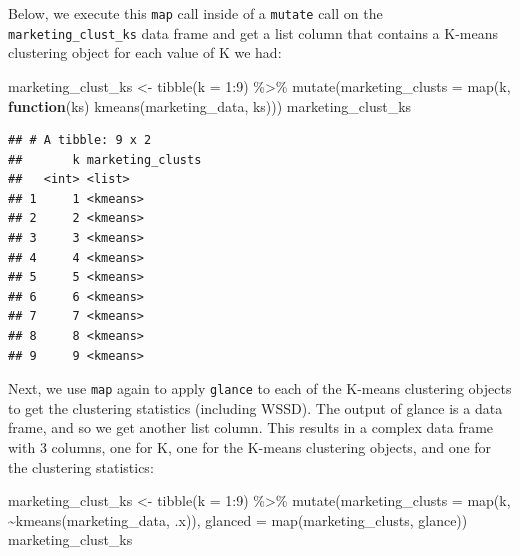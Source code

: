 \documentclass[
]{krantz}
\makeatletter
\newenvironment{Shaded}{\begin{snugshade}}{\end{snugshade}}
\newcommand{\AttributeTok}[1]{\textcolor[rgb]{0.61,0.61,0.61}{#1}}
\newcommand{\ControlFlowTok}[1]{\textcolor[rgb]{0.27,0.27,0.27}{\textbf{#1}}}
\newcommand{\DecValTok}[1]{\textcolor[rgb]{0.06,0.06,0.06}{#1}}
\newcommand{\FunctionTok}[1]{\textcolor[rgb]{0,0,0}{#1}}
\newcommand{\NormalTok}[1]{#1}
\newcommand{\OtherTok}[1]{\textcolor[rgb]{0.37,0.37,0.37}{#1}}
\newcommand{\SpecialCharTok}[1]{\textcolor[rgb]{0,0,0}{#1}}
\newenvironment{kframe}{%
\medskip{}
\setlength{\fboxsep}{.8em}
 \def\at@end@of@kframe{}%
 \ifinner\ifhmode%
  \def\at@end@of@kframe{\end{minipage}}%
  \begin{minipage}{\columnwidth}%
 \fi\fi%
 \def\FrameCommand##1{\hskip\@totalleftmargin \hskip-\fboxsep
 \colorbox{shadecolor}{##1}\hskip-\fboxsep
     \hskip-\linewidth \hskip-\@totalleftmargin \hskip\columnwidth}%
 \MakeFramed {\advance\hsize-\width
   \@totalleftmargin\z@ \linewidth\hsize
   \@setminipage}}%
 {\par\unskip\endMakeFramed%
 \at@end@of@kframe}
\renewenvironment{Shaded}{\begin{kframe}}{\end{kframe}}
\makeatother
\begin{document}
Below, we execute this \texttt{map} call inside of a \texttt{mutate} call on the
\texttt{marketing\_clust\_ks} data frame and get a list column that contains a K-means
clustering object for each value of K we had:

\begin{Shaded}
\begin{Highlighting}[]
\NormalTok{marketing\_clust\_ks }\OtherTok{\textless{}{-}} \FunctionTok{tibble}\NormalTok{(}\AttributeTok{k =} \DecValTok{1}\SpecialCharTok{:}\DecValTok{9}\NormalTok{) }\SpecialCharTok{\%\textgreater{}\%}
  \FunctionTok{mutate}\NormalTok{(}\AttributeTok{marketing\_clusts =} \FunctionTok{map}\NormalTok{(k, }\ControlFlowTok{function}\NormalTok{(ks) }\FunctionTok{kmeans}\NormalTok{(marketing\_data, ks)))}
\NormalTok{marketing\_clust\_ks}
\end{Highlighting}
\end{Shaded}

\begin{verbatim}
## # A tibble: 9 x 2
##       k marketing_clusts
##   <int> <list>          
## 1     1 <kmeans>        
## 2     2 <kmeans>        
## 3     3 <kmeans>        
## 4     4 <kmeans>        
## 5     5 <kmeans>        
## 6     6 <kmeans>        
## 7     7 <kmeans>        
## 8     8 <kmeans>        
## 9     9 <kmeans>
\end{verbatim}

Next, we use \texttt{map} again to apply \texttt{glance} to each of the K-means
clustering objects to get the clustering statistics (including WSSD). The output
of glance is a data frame, and so we get another list column. This results in a
complex data frame with 3 columns, one for K, one for the
K-means clustering objects, and one for the clustering statistics:

\begin{Shaded}
\begin{Highlighting}[]
\NormalTok{marketing\_clust\_ks }\OtherTok{\textless{}{-}} \FunctionTok{tibble}\NormalTok{(}\AttributeTok{k =} \DecValTok{1}\SpecialCharTok{:}\DecValTok{9}\NormalTok{) }\SpecialCharTok{\%\textgreater{}\%}
  \FunctionTok{mutate}\NormalTok{(}\AttributeTok{marketing\_clusts =} \FunctionTok{map}\NormalTok{(k, }\SpecialCharTok{\textasciitilde{}}\FunctionTok{kmeans}\NormalTok{(marketing\_data, .x)),}
         \AttributeTok{glanced =} \FunctionTok{map}\NormalTok{(marketing\_clusts, glance)) }
\NormalTok{marketing\_clust\_ks}
\end{Highlighting}
\end{Shaded}
\end{document}
